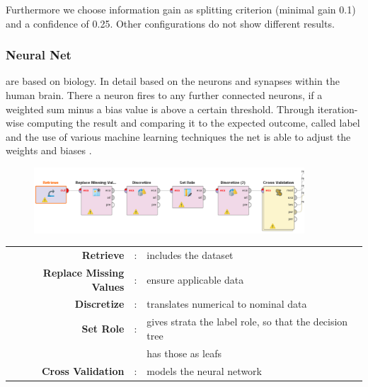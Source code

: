 	Furthermore we choose information gain as splitting criterion (minimal gain 0.1) and a confidence of 0.25. Other configurations do not show different results.
	
	\subsubsection{Neural Net}
	are based on biology. In detail based on the neurons and synapses within the human brain. There a neuron fires to any further connected neurons, if a weighted sum minus a bias value is above a certain threshold.
	Through iteration-wise computing the result and comparing it to the expected outcome, called label and the use of various machine learning techniques the net is able to adjust the weights and biases \cite{neuralNet}.
	
	\begin{figure}[H]
		\centering
		\includegraphics[width = 0.9\textwidth]{RapidNN.PNG}
	\end{figure}
		\begin{tabular}{r c l}
		\textbf{Retrieve} & : & includes the dataset\\
		\textbf{Replace Missing Values} & : & ensure applicable data\\
		\textbf{Discretize} & : & translates numerical to nominal data \\
		\textbf{Set Role} & : & gives strata the label role, so that the decision tree\\
		&& has those as leafs\\		
		\textbf{Cross Validation} & : & models the neural network \\
	\end{tabular}
	
